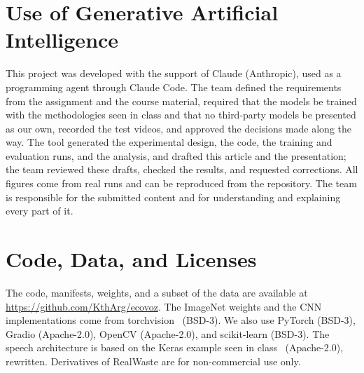 \section*{Use of Generative Artificial Intelligence}

This project was developed with the support of Claude (Anthropic), used as a programming agent through Claude Code. The team defined the requirements from the assignment and the course material, required that the models be trained with the methodologies seen in class and that no third-party models be presented as our own, recorded the test videos, and approved the decisions made along the way. The tool generated the experimental design, the code, the training and evaluation runs, and the analysis, and drafted this article and the presentation; the team reviewed these drafts, checked the results, and requested corrections. All figures come from real runs and can be reproduced from the repository. The team is responsible for the submitted content and for understanding and explaining every part of it.

\section*{Code, Data, and Licenses}

The code, manifests, weights, and a subset of the data are available at \url{https://github.com/KthArg/ecovoz}. The ImageNet weights and the CNN implementations come from torchvision~\cite{torchvision} (BSD-3). We also use PyTorch (BSD-3), Gradio (Apache-2.0), OpenCV (Apache-2.0), and scikit-learn (BSD-3). The speech architecture is based on the Keras example seen in class~\cite{keras-ctc} (Apache-2.0), rewritten. Derivatives of RealWaste are for non-commercial use only.
